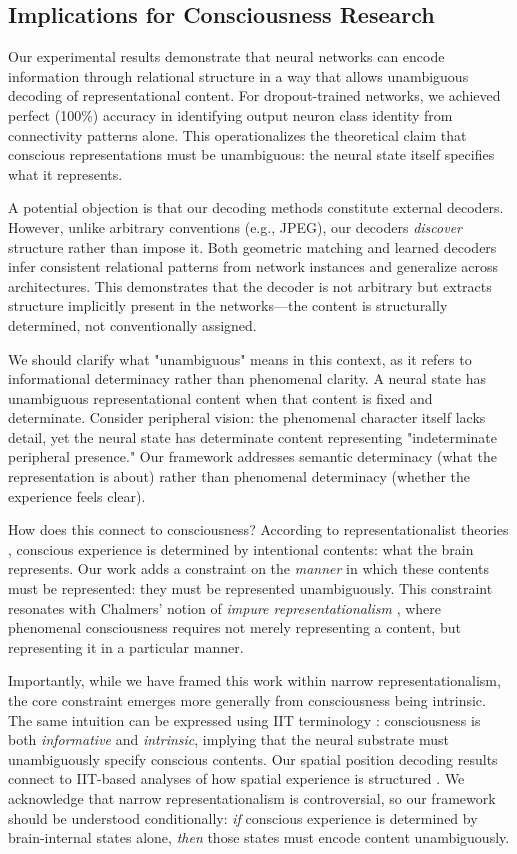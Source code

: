 \subsection{Implications for Consciousness Research}

Our experimental results demonstrate that neural networks can encode information through relational structure in a way that allows unambiguous decoding of representational content. For dropout-trained networks, we achieved perfect (100\%) accuracy in identifying output neuron class identity from connectivity patterns alone. This operationalizes the theoretical claim that conscious representations must be unambiguous: the neural state itself specifies what it represents.

A potential objection is that our decoding methods constitute external decoders. However, unlike arbitrary conventions (e.g., JPEG), our decoders \emph{discover} structure rather than impose it. Both geometric matching and learned decoders infer consistent relational patterns from network instances and generalize across architectures. This demonstrates that the decoder is not arbitrary but extracts structure implicitly present in the networks—the content is structurally determined, not conventionally assigned.

We should clarify what "unambiguous" means in this context, as it refers to informational determinacy rather than phenomenal clarity. A neural state has unambiguous representational content when that content is fixed and determinate. Consider peripheral vision: the phenomenal character itself lacks detail, yet the neural state has determinate content representing "indeterminate peripheral presence." Our framework addresses semantic determinacy (what the representation is about) rather than phenomenal determinacy (whether the experience feels clear).

How does this connect to consciousness? According to representationalist theories \citep{lycan2019representational,pennartz2018consciousness}, conscious experience is determined by intentional contents: what the brain represents. Our work adds a constraint on the \emph{manner} in which these contents must be represented: they must be represented unambiguously. This constraint resonates with Chalmers' notion of \emph{impure representationalism} \citep{chalmers2004representational}, where phenomenal consciousness requires not merely representing a content, but representing it in a particular manner.

Importantly, while we have framed this work within narrow representationalism, the core constraint emerges more generally from consciousness being intrinsic. The same intuition can be expressed using IIT terminology \citep{tononi2016integrated}: consciousness is both \emph{informative} and \emph{intrinsic}, implying that the neural substrate must unambiguously specify conscious contents. Our spatial position decoding results connect to IIT-based analyses of how spatial experience is structured \citep{haun2019space}. We acknowledge that narrow representationalism is controversial, so our framework should be understood conditionally: \emph{if} conscious experience is determined by brain-internal states alone, \emph{then} those states must encode content unambiguously.

